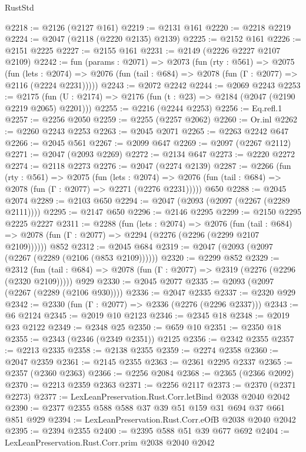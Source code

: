 \begin{lexlean}{RustStd}
\begin{coremodule}
@2218 := @2126 (@2127 @161)
@2219 := @2131 @161
@2220 := @2218 @2219
@2224 := @2047 (@2118 (@2220 @2135) @2139)
@2225 := @2152 @161
@2226 := @2151 @2225
@2227 := @2155 @161
@2231 := @2149 (@2226 @2227 @2107 @2109)
@2242 := fun (params : @2071) =>
  @2073
    (fun (rty : @561) =>
    @2075
      (fun (lets : @2074) =>
      @2076 (fun (tail : @684) => @2078 (fun (Γ : @2077) => @2116 (@2224 @2231)))))
@2243 := @2072 @2242
@2244 := @2069 @2243
@2253 := @2175 (fun (U : @2174) => @2176 (fun (t : @23) => @2184 (@2047 (@2190 @2219 @2065) @2201)))
@2255 := @2216 (@2244 @2253)
@2256 := Eq.refl.{1}
@2257 := @2256 @2050
@2259 := @2255 (@2257 @2062)
@2260 := Or.inl
@2262 := @2260 @2243 @2253
@2263 := @2045 @2071
@2265 := @2263 @2242 @647
@2266 := @2045 @561
@2267 := @2099 @647
@2269 := @2097 (@2267 @2112)
@2271 := @2047 (@2093 @2269)
@2272 := @2134 @647
@2273 := @2220 @2272
@2274 := @2118 @2273
@2276 := @2047 (@2274 @2139)
@2287 := @2266
    (fun (rty : @561) =>
    @2075
      (fun (lets : @2074) =>
      @2076 (fun (tail : @684) => @2078 (fun (Γ : @2077) => @2271 (@2276 @2231)))))
    @650
@2288 := @2045 @2074
@2289 := @2103 @650
@2294 := @2047 (@2093 (@2097 (@2267 (@2289 @2111))))
@2295 := @2147 @650
@2296 := @2146 @2295
@2299 := @2150 @2295 @2225 @2227
@2311 := @2288
    (fun (lets : @2074) =>
    @2076
      (fun (tail : @684) => @2078 (fun (Γ : @2077) => @2294 (@2276 (@2296 (@2299 @2107 @2109))))))
    @852
@2312 := @2045 @684
@2319 := @2047 (@2093 (@2097 (@2267 (@2289 (@2106 (@853 @2109))))))
@2320 := @2299 @852
@2329 := @2312
    (fun (tail : @684) => @2078 (fun (Γ : @2077) => @2319 (@2276 (@2296 (@2320 @2109)))))
    @929
@2330 := @2045 @2077
@2335 := @2093 (@2097 (@2267 (@2289 (@2106 @930))))
@2336 := @2047 @2335
@2337 := @2320 @929
@2342 := @2330 (fun (Γ : @2077) => @2336 (@2276 (@2296 @2337)))
@2343 := @6 @2124
@2345 := @2019 @10 @2123
@2346 := @2345 @18
@2348 := @2019 @23 @2122
@2349 := @2348 @25
@2350 := @659 @10
@2351 := @2350 @18
@2355 := @2343 (@2346 (@2349 @2351)) @2125
@2356 := @2342 @2355
@2357 := @2213 @2335
@2358 := @2138 @2355
@2359 := @2274 @2358
@2360 := @2047 @2359
@2361 := @2145 @2355
@2363 := @2361 @2295 @2337
@2365 := @2357 (@2360 @2363)
@2366 := @2256 @2084
@2368 := @2365 (@2366 @2092)
@2370 := @2213 @2359 @2363
@2371 := @2256 @2117
@2373 := @2370 (@2371 @2273)
@2377 := LexLeanPreservation.Rust.Corr.letBind @2038 @2040 @2042
@2390 := @2377 @2355 @588 @588 @37 @39 @51 @159 @31 @694 @37 @661 @851 @929
@2394 := LexLeanPreservation.Rust.Corr.eOfB @2038 @2040 @2042
@2395 := @2394 @2355
@2400 := @2395 @588 @51 @39 @677 @692
@2404 := LexLeanPreservation.Rust.Corr.prim @2038 @2040 @2042

\end{coremodule}
\end{lexlean}
